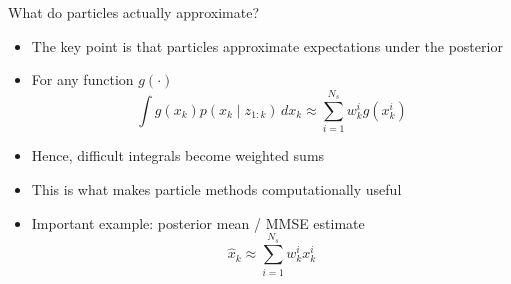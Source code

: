 \documentclass[aspectratio=169]{beamer}
\begin{document}

\begin{frame}{What do particles actually approximate?}

\begin{itemize}
    \item The key point is that particles approximate expectations under the posterior
    \item For any function $g(\cdot)$
        \[
        \int g(x_k) p(x_k \mid z_{1:k}) \, dx_k
        \approx
        \sum_{i=1}^{N_s} w_k^i g(x_k^i)
        \]
    \item Hence, difficult integrals become weighted sums
    \item This is what makes particle methods computationally useful
    \item Important example: posterior mean / MMSE estimate
        \[
        \hat{x}_k
        \approx
        \sum_{i=1}^{N_s} w_k^i x_k^i
        \]
\end{itemize}




\end{frame}





\end{document}
